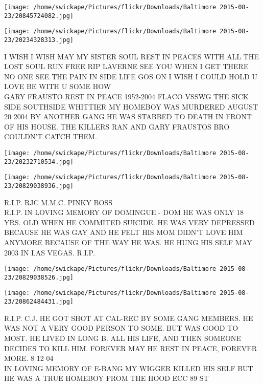 \documentclass[10pt,letterpaper]{article}
\begin{document}
\texttt{[image: /home/swickape/Pictures/flickr/Downloads/Baltimore 2015-08-23/20845724082.jpg]}

\vspace{0.25in}
\texttt{[image: /home/swickape/Pictures/flickr/Downloads/Baltimore 2015-08-23/20234328313.jpg]}

I WISH I WISH MAY MY SISTER SOUL REST IN PEACES WITH ALL THE LOST SOUL RUN FREE RIP LAVERNE SEE YOU WHEN I GET THERE NO ONE SEE THE PAIN IN SIDE LIFE GOS ON I WISH I COULD HOLD U LOVE BE WITH U SOME HOW\\
GARY FRAUSTO REST IN PEACE 1952{-}2004 FLACO VSSWG THE SICK SIDE SOUTHSIDE WHITTIER MY HOMEBOY WAS MURDERED AUGUST 20 2004 BY ANOTHER GANG HE WAS STABBED TO DEATH IN FRONT OF HIS HOUSE.  THE KILLERS RAN AND GARY FRAUSTOS BRO COULDN'T CATCH THEM.\\
\pagebreak

\texttt{[image: /home/swickape/Pictures/flickr/Downloads/Baltimore 2015-08-23/20232710534.jpg]}

\vspace{0.25in}
\texttt{[image: /home/swickape/Pictures/flickr/Downloads/Baltimore 2015-08-23/20829038936.jpg]}

R.I.P. RJC M.M.C. PINKY BOSS\\
R.I.P. IN LOVING MEMORY OF DOMINGUE {-} DOM HE WAS ONLY 18 YRS. OLD WHEN HE COMMITED SUICIDE.  HE WAS VERY DEPRESSED BECAUSE HE WAS GAY AND HE FELT HIS MOM DIDN'T LOVE HIM ANYMORE BECAUSE OF THE WAY HE WAS.  HE HUNG HIS SELF MAY 2003 IN LAS VEGAS.  R.I.P.\\
\pagebreak

\texttt{[image: /home/swickape/Pictures/flickr/Downloads/Baltimore 2015-08-23/20829038526.jpg]}

\vspace{0.25in}
\texttt{[image: /home/swickape/Pictures/flickr/Downloads/Baltimore 2015-08-23/20862484431.jpg]}

R.I.P. C.J. HE GOT SHOT AT CAL{-}REC BY SOME GANG MEMBERS.  HE WAS NOT A VERY GOOD PERSON TO SOME.  BUT WAS GOOD TO MOST.  HE LIVED IN LONG B. ALL HIS LIFE, AND THEN SOMEONE DECIDES TO KILL HIM.  FOREVER MAY HE REST IN PEACE, FOREVER MORE.  8 12 04\\
IN LOVING MEMORY OF E{-}BANG MY WIGGER KILLED HIS SELF BUT HE WAS A TRUE HOMEBOY FROM THE HOOD ECC 89 ST\\
\pagebreak
\end{document}
